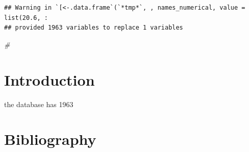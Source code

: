 \documentclass[
]{article}
\newenvironment{Shaded}{}{}
\newcommand{\CommentTok}[1]{\textcolor[rgb]{0.38,0.63,0.69}{\textit{#1}}}
\newlength{\cslhangindent}
\newlength{\cslentryspacingunit} %
\newenvironment{CSLReferences}[2] %
 {%
  \setlength{\parindent}{0pt}
  \ifodd #1
  \let\oldpar\par
  \def\par{\hangindent=\cslhangindent\oldpar}
  \fi
  \setlength{\parskip}{#2\cslentryspacingunit}
 }%
 {}
\begin{document}
\begin{verbatim}
## Warning in `[<-.data.frame`(`*tmp*`, , names_numerical, value = list(20.6, :
## provided 1963 variables to replace 1 variables
\end{verbatim}

\begin{Shaded}
\begin{Highlighting}[]
\CommentTok{\#\textasciigrave{}\textasciigrave{}\textasciigrave{}}
\end{Highlighting}
\end{Shaded}

\newpage

\hypertarget{introduction}{%
\section{Introduction}\label{introduction}}

the database has 1963

\hypertarget{bibliography}{%
\section{Bibliography}\label{bibliography}}

\hypertarget{refs}{}
\begin{CSLReferences}{0}{0}
\end{CSLReferences}
\end{document}
